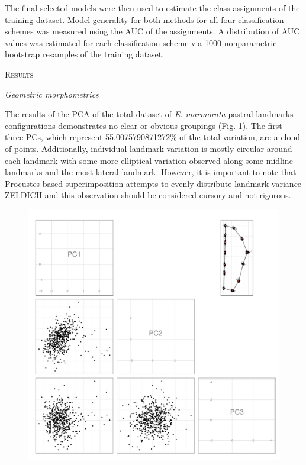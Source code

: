 \documentclass[12pt,letterpaper]{article}\usepackage{graphicx, color}
\renewcommand{\section}[1]{%
\bigskip
\begin{center}
\begin{Large}
\normalfont\scshape #1
\medskip
\end{Large}
\end{center}}
\renewcommand{\subsection}[1]{%
\bigskip
\begin{center}
\begin{large}
\normalfont\itshape #1
\end{large}
\end{center}}
\begin{document}
The final selected models were then used to estimate the class assignments of the training dataset. Model generality for both methods for all four classification schemes was measured using the AUC of the assignments. A distribution of AUC values was estimated for each classification scheme via 1000 nonparametric bootstrap resamples of the training dataset.

\section{Results}
\subsection{Geometric morphometrics}
The results of the PCA of the total dataset of \textit{E. marmorata} pastral landmarks configurations demonstrates no clear or obvious groupings (Fig. \ref{fig:pca}). The first three PCs, which represent 55.0075790871272\% of the total variation, are a cloud of points. Additionally, individual landmark variation is mostly circular around each landmark with some more elliptical variation observed along some midline landmarks and the most lateral landmark. However, it is important to note that Procustes based superimposition attempts to evenly distribute landmark variance ZELDICH and this observation should be considered cursory and not rigorous.

\begin{figure}[ht]
  \centering
  \includegraphics[width = \textwidth]{figure/pca_res}
  \caption{}
  \label{fig:pca}
\end{figure}
\end{document}
